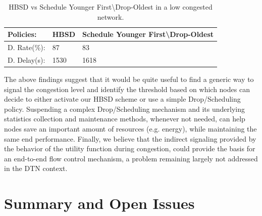 \begin{table}[!h]
\renewcommand{\arraystretch}{1.1}
\caption{HBSD vs Schedule Younger First\textbackslash Drop-Oldest in a low congested network.}
\centering
\footnotesize
\begin{tabular}{|p{1.8cm}||p{2cm}||p{6cm}|}
\hline
\bfseries Policies: & HBSD & Schedule Younger First\textbackslash Drop-Oldest\\
\hline\hline
D. Rate(\%):&87&83\\
\hline\hline
D. Delay(s):&1530&1618\\
\hline
\end{tabular}
\label{DO-HBSD-LC}
\end{table}

The above findings suggest that it would be quite useful to find a generic way to signal the congestion level and identify the threshold based on which nodes can decide to either activate our HBSD scheme or use a simple Drop/Scheduling policy. Suspending a complex Drop/Scheduling mechanism and its underlying statistics collection and maintenance methods, whenever not needed, can help nodes save an important amount of resources (e.g. energy), while maintaining the same end performance. Finally, we believe that the indirect signaling provided by the behavior of the utility function during congestion, could provide the basis for an end-to-end flow control mechanism, a problem remaining largely not addressed in the DTN context.

\section{Summary and Open Issues}
\label{sec:conclusion}


